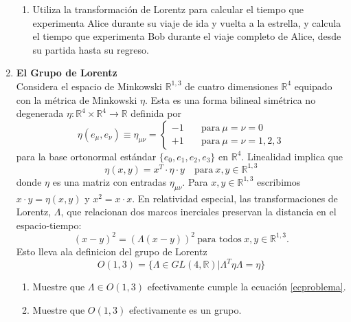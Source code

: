 \documentclass[../main]{subfiles}
\begin{document}
\begin{enumerate}
\begin{enumerate}
        \item Utiliza la transformación de Lorentz para calcular el tiempo que experimenta Alice durante su viaje de ida y vuelta a la estrella, y calcula el tiempo que experimenta Bob durante el viaje completo de Alice, desde su partida hasta su regreso.
    \end{enumerate}
    \item \textbf{El Grupo de Lorentz}\\
    Considera el espacio de Minkowski $\mathbb{R}^{1, 3}$ de cuatro dimensiones $\mathbb{R}^4$ equipado con la métrica de Minkowski $\eta$. Esta es una forma bilineal simétrica no degenerada $\eta: \mathbb{R}^4 \times \mathbb{R}^4 \rightarrow \mathbb{R}$ definida por 
    \begin{equation}
        \eta(e_{\mu}, e_{\nu})\equiv \eta_{\mu\nu}=
        \left\{
        \begin{split}
            -1 &\quad \text{para} \ \mu=\nu=0\\
            +1 &\quad \text{para} \ \mu=\nu=1, 2, 3
        \end{split}
        \right.
    \end{equation}
    para la base ortonormal estándar $\{e_0, e_1, e_2, e_3\}$ en $\mathbb{R}^4$. Linealidad implica que 
    \begin{equation}
        \eta(x, y)=x^T\cdot \eta \cdot y \quad \text{para} \ x,y \in \mathbb{R}^{1, 3}
    \end{equation}
    donde $\eta$ es una matriz con entradas $\eta_{\mu\nu}$. Para $x, y \in \mathbb{R}^{1, 3}$ escribimos $x\cdot y=\eta(x, y)$ y $x^2=x\cdot x$. En relatividad especial, las transformaciones de Lorentz, $\Lambda$, que relacionan dos marcos inerciales preservan la distancia en el espacio-tiempo:
    \begin{equation}
        (x-y)^2=(\Lambda(x-y))^2 \ \text{para todos} \ x, y \in \mathbb{R}^{1, 3}.
        \label{ecproblema}
    \end{equation} 
    Esto lleva ala definicion del grupo de Lorentz 
    \begin{equation}
        O(1, 3)=\{\Lambda \in GL(4, \mathbb{R})| \Lambda^T\eta \Lambda=\eta \}
    \end{equation}
    \begin{enumerate}
        \item Muestre que $\Lambda \in O(1,3)$ efectivamente cumple la ecuación \eqref{ecproblema}.
        \item Muestre que $O(1, 3)$ efectivamente es un grupo.

\end{enumerate}
\end{enumerate}
\end{document}
